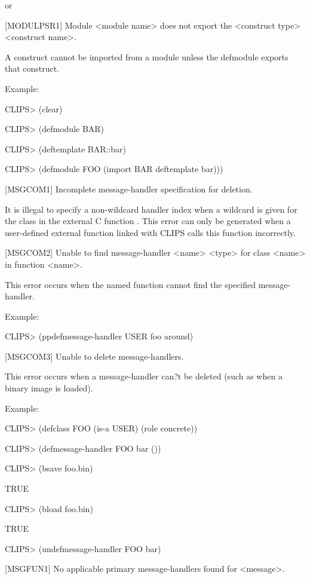 \documentclass[letterpaper,10pt,english]{sphinxmanual}
\begin{document}
or

{[}MODULPSR1{]} Module \textless{}module name\textgreater{} does not export the \textless{}construct type\textgreater{}
\textless{}construct name\textgreater{}.

A construct cannot be imported from a module unless the defmodule
exports that construct.

Example:

CLIPS\textgreater{} (clear)

CLIPS\textgreater{} (defmodule BAR)

CLIPS\textgreater{} (deftemplate BAR::bar)

CLIPS\textgreater{} (defmodule FOO (import BAR deftemplate bar)))

{[}MSGCOM1{]} Incomplete message-handler specification for deletion.

It is illegal to specify a non-wildcard handler index when a wildcard is
given for the class in the external C function
. This error can only be generated when a
user-defined external function linked with CLIPS calls this function
incorrectly.

{[}MSGCOM2{]} Unable to find message-handler \textless{}name\textgreater{} \textless{}type\textgreater{} for class \textless{}name\textgreater{}
in function \textless{}name\textgreater{}.

This error occurs when the named function cannot find the specified
message-handler.

Example:

CLIPS\textgreater{} (ppdefmessage-handler USER foo around)

{[}MSGCOM3{]} Unable to delete message-handlers.

This error occurs when a message-handler can?t be deleted (such as when
a binary image is loaded).

Example:

CLIPS\textgreater{} (defclass FOO (is-a USER) (role concrete))

CLIPS\textgreater{} (defmessage-handler FOO bar ())

CLIPS\textgreater{} (bsave foo.bin)

TRUE

CLIPS\textgreater{} (bload foo.bin)

TRUE

CLIPS\textgreater{} (undefmessage-handler FOO bar)

{[}MSGFUN1{]} No applicable primary message-handlers found for \textless{}message\textgreater{}.
\end{document}
